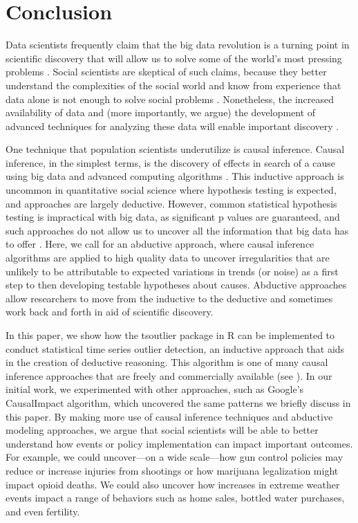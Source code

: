 \documentclass[12pt]{article}
\begin{document}
\hypertarget{conclusion}{%
\section{Conclusion}\label{conclusion}}

Data scientists frequently claim that the big data revolution is a
turning point in scientific discovery that will allow us to solve some
of the world's most pressing problems \citep{grimmer2015ppsp}. Social
scientists are skeptical of such claims, because they better understand
the complexities of the social world and know from experience that data
alone is not enough to solve social problems
\citep{bohon2018demography, grimmer2015ppsp}. Nonetheless, the increased
availability of data and (more importantly, we argue) the development of
advanced techniques for analyzing these data will enable important
discovery \citep{monroe2015no}.

One technique that population scientists underutilize is causal
inference. Causal inference, in the simplest terms, is the discovery of
effects in search of a cause using big data and advanced computing
algorithms \citep{imai2008misunderstandings}. This inductive approach is
uncommon in quantitative social science where hypothesis testing is
expected, and approaches are largely deductive. However, common
statistical hypothesis testing is impractical with big data, as
significant p values are guaranteed, and such approaches do not allow us
to uncover all the information that big data has to offer
\citep{monroe2015no}. Here, we call for an abductive approach, where
causal inference algorithms are applied to high quality data to uncover
irregularities that are unlikely to be attributable to expected
variations in trends (or noise) as a first step to then developing
testable hypotheses about causes. Abductive approaches allow researchers
to move from the inductive to the deductive and sometimes work back and
forth in aid of scientific discovery.

In this paper, we show how the tsoutlier package in R can be implemented
to conduct statistical time series outlier detection, an inductive
approach that aids in the creation of deductive reasoning. This
algorithm is one of many causal inference approaches that are freely and
commercially available (see \citet{rcausalimpact}). In our initial work,
we experimented with other approaches, such as Google's CausalImpact
algorithm, which uncovered the same patterns we briefly discuss in this
paper. By making more use of causal inference techniques and abductive
modeling approaches, we argue that social scientists will be able to
better understand how events or policy implementation can impact
important outcomes. For example, we could uncover---on a wide
scale---how gun control policies may reduce or increase injuries from
shootings or how marijuana legalization might impact opioid deaths. We
could also uncover how increases in extreme weather events impact a
range of behaviors such as home sales, bottled water purchases, and even
fertility.
\end{document}
